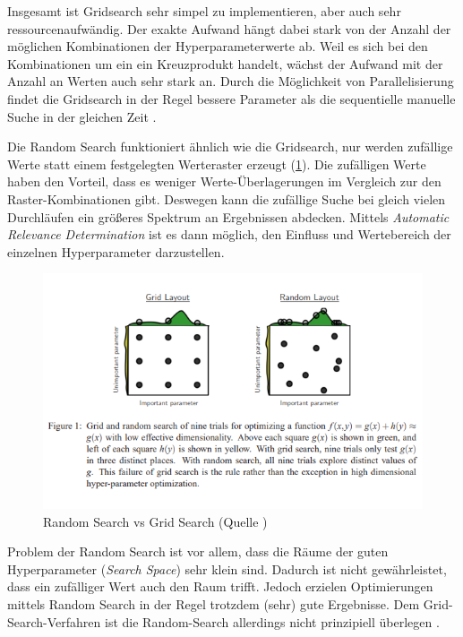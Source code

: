 Insgesamt ist Gridsearch sehr simpel zu implementieren, aber auch sehr ressourcenaufwändig.
Der exakte Aufwand hängt dabei stark von der Anzahl der möglichen Kombinationen der Hyperparameterwerte ab.
Weil es sich bei den Kombinationen um ein ein Kreuzprodukt handelt, wächst der Aufwand mit der Anzahl an Werten auch sehr stark an.
Durch die Möglichkeit von Parallelisierung findet die Gridsearch in der Regel bessere Parameter als die sequentielle manuelle Suche in der gleichen Zeit \cite{hyperparameters-random-search}.

Die Random Search \cite{hyperparameters-random-search} funktioniert ähnlich wie die Gridsearch, nur werden zufällige Werte statt einem festgelegten Werteraster erzeugt (\cref{img:random-search}).
Die zufälligen Werte haben den Vorteil, dass es weniger Werte-Überlagerungen im Vergleich zur den Raster-Kombinationen gibt.
Deswegen kann die zufällige Suche bei gleich vielen Durchläufen ein größeres Spektrum an Ergebnissen abdecken.
Mittels \textit{Automatic Relevance Determination} \cite{automatic-relevance-determination} ist es dann möglich, den Einfluss und Wertebereich der einzelnen Hyperparameter darzustellen.

\begin{figure}[H]
	\includegraphics{kapitel/2_stand_der_technik/img/random-vs-grid-search.png}
	\caption{Random Search vs Grid Search (Quelle \cite{hyperparameters-random-search})}
	\label{img:random-search}
\end{figure}

Problem der Random Search ist vor allem, dass die Räume der guten Hyperparameter (\textit{Search Space}) sehr klein sind.
Dadurch ist nicht gewährleistet, dass ein zufälliger Wert auch den Raum trifft.
Jedoch erzielen Optimierungen mittels Random Search in der Regel trotzdem (sehr) gute Ergebnisse.
Dem Grid-Search-Verfahren ist die Random-Search allerdings nicht prinzipiell überlegen \cite{hyperparameters-random-search}.

